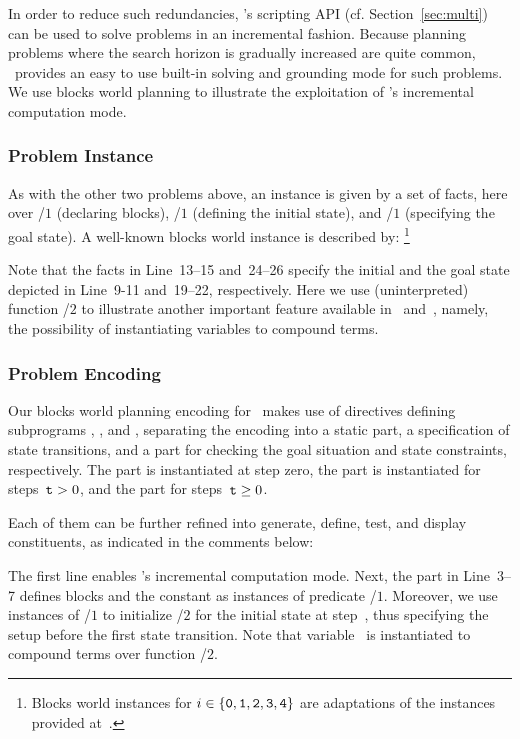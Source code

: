 In order to reduce such redundancies,
\clingo's scripting API (cf. Section~\ref{sec:multi}) can be used to solve problems in an incremental fashion.
Because planning problems where the search horizon is gradually increased are quite common,
\clingo\ provides an easy to use built-in solving and grounding mode for such problems.
We use blocks world planning to illustrate the exploitation of
\clingo's incremental computation mode.

\subsubsection{Problem Instance}\label{subsec:block:instance}

As with the other two problems above,
an instance is given by a set of facts, here
over %
/$1$ (declaring blocks),
/$1$ (defining the initial state), and
/$1$ (specifying the goal state).
A well-known blocks world instance is described by:%
\footnote{%
  Blocks world instances  for $i\in\{\texttt{0},\texttt{1},\texttt{2},\texttt{3},\texttt{4}\}$
  are adaptations of the instances provided at~\cite{erdemBW}.}
%

%
Note that the facts in Line~13--15 and~24--26 specify the initial
and the goal state depicted in Line~9-11 and~19--22, respectively.
Here we use (uninterpreted) function /$2$ to illustrate another
important feature available in \gringo\ and~\clingo, namely,
the possibility of instantiating variables to compound terms.


\subsubsection{Problem Encoding}\label{subsec:block:encoding}

Our blocks world planning encoding for \clingo\ makes use of  directives
defining subprograms , , and ,
separating the encoding into 
a static part, 
a specification of state transitions, 
and a part for checking the goal situation and state constraints, respectively.
The  part is instantiated at step zero,
the  part is instantiated for steps~$\texttt{t}>0$,
and the  part %
for steps~$\texttt{t}\geq0$.

Each of them can be further refined into generate, define, test, and display constituents, 
as indicated in the comments below:
%

%
The first line enables \clingo's incremental computation mode.
%
Next, %
the  part in Line~3--7 %
defines blocks and the constant 
as instances of predicate /$1$.
Moreover, we use instances of /$1$
to initialize %
/$2$ for the initial state at step~, thus
specifying the setup before the first state transition.
Note that variable~ is instantiated to compound terms
over function /$2$.

